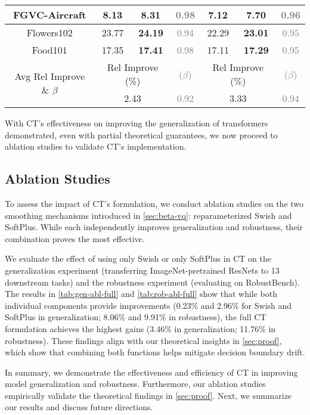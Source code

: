 \begin{table}[h]
\begin{center}
\begin{small}
{\begin{tabular}{|c|c|c|c|c|c|c|}
FGVC-Aircraft     & 8.13 & \textbf{8.31} & \textcolor{gray}{0.98} 
                  & 7.12 & \textbf{7.70} & \textcolor{gray}{0.96} \\ \hline
Flowers102        & 23.77 & \textbf{24.19} & \textcolor{gray}{0.94}
                  & 22.29 & \textbf{23.01} & \textcolor{gray}{0.95} \\ \hline
Food101           & 17.35 & \textbf{17.41} & \textcolor{gray}{0.98} 
                  & 17.11 & \textbf{17.29} & \textcolor{gray}{0.95}  \\ \hline
\multirow{2}{*}{Avg Rel Improve \& $\beta$} & \multicolumn{2}{c|}{Rel Improve (\%)} & \textcolor{gray}{($\beta$)} & \multicolumn{2}{c|}{Rel Improve (\%)} & \textcolor{gray}{($\beta$)} \\ \cline{2-7} 
                  & \multicolumn{2}{c|}{2.43} 
                  & \textcolor{gray}{0.92}
                  & \multicolumn{2}{c|}{3.33} 
                  & \textcolor{gray}{0.94} \\ \hline
\end{tabular}
}
\end{small}
\end{center}
\vskip -0.1in
\end{table}

With CT's effectiveness on improving the generalization of transformers demonstrated, even with partial theoretical guarantees, we now proceed to ablation studies to validate CT's implementation.

\subsection{Ablation Studies}\label{sec:exp-abl}
To assess the impact of CT’s formulation, we conduct ablation studies on the two smoothing mechanisms introduced in \cref{sec:beta-vq}: reparameterized Swish and SoftPlus. While each independently improves generalization and robustness, their combination proves the most effective.

We evaluate the effect of using only Swish or only SoftPlus in CT on the generalization experiment (transferring ImageNet-pretrained ResNets to 13 downstream tasks) and the robustness experiment (evaluating on RobustBench). The results in \cref{tab:gen-abl-full} and \cref{tab:rob-abl-full} show that while both individual components provide improvements (0.23\% and 2.96\% for Swish and SoftPlus in generalization; 8.06\% and 9.91\% in robustness), the full CT formulation achieves the highest gains (3.46\% in generalization; 11.76\% in robustness). These findings align with our theoretical insights in \cref{sec:proof}, which show that combining both functions helps mitigate decision boundary drift.

In summary, we demonstrate the effectiveness and efficiency of CT in improving model generalization and robustness. Furthermore, our ablation studies empirically validate the theoretical findings in \cref{sec:proof}. Next, we summarize our results and discuss future directions.